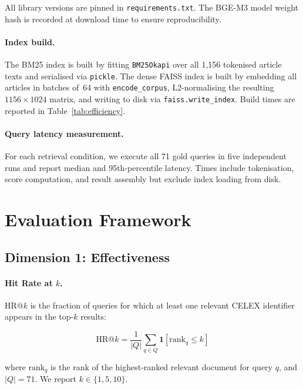 \documentclass{iosart2x}
\makeatletter
\newcommand{\HR}[1]{\text{HR}@{#1}}
\newcommand{\bgem}{BGE-M3\xspace}
\makeatother
\begin{document}
All library versions are pinned in \texttt{requirements.txt}.  The
\bgem model weight hash is recorded at download time to ensure
reproducibility.

\paragraph{Index build.}
The BM25 index is built by fitting \texttt{BM25Okapi} over all 1,156
tokenised article texts and serialised via \texttt{pickle}.
The dense FAISS index is built by embedding all articles in batches
of~64 with \texttt{encode\_corpus}, L2-normalising the resulting
$1156 \times 1024$ matrix, and writing to disk via
\texttt{faiss.write\_index}.  Build times are reported in
Table~\ref{tab:efficiency}.

\paragraph{Query latency measurement.}
For each retrieval condition, we execute all 71 gold queries in five
independent runs and report median and 95th-percentile latency.
Times include tokenisation, score computation, and result assembly
but exclude index loading from disk.

\section{Evaluation Framework}
\label{sec:eval}

\subsection{Dimension 1: Effectiveness}
\label{sec:eval-effectiveness}

\paragraph{Hit Rate at $k$.}  $\HR{k}$ is the fraction of queries for
which at least one relevant CELEX identifier appears in the top-$k$
results:

\begin{equation}
  \label{eq:hitrate}
  \HR{k} = \frac{1}{|Q|}\sum_{q \in Q}
    \mathbf{1}\!\left[\mathrm{rank}_q \leq k\right]
\end{equation}

\noindent where $\mathrm{rank}_q$ is the rank of the highest-ranked
relevant document for query $q$, and $|Q|{=}71$.  We report
$k \in \{1, 5, 10\}$.
\end{document}
